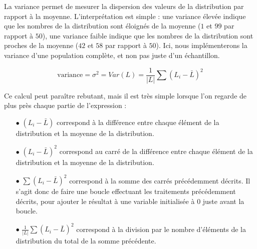 \documentclass[11pt,a4paper]{article}
\begin{document}
\bigskip

La variance permet de mesurer la dispersion des valeurs de la distribution par rapport à la moyenne.
L'interprétation est simple : une variance élevée indique que les nombres de la distribution sont éloignés de la moyenne ($ 1 $ et $ 99 $ par rapport à $ 50 $), une variance faible indique que les nombres de la distribution sont proches de la moyenne ($ 42 $ et $ 58 $ par rapport à $ 50 $).
Ici, nous implémenterons la variance d'une population complète, et non pas juste d'un échantillon.


\begin{center}
\begin{equation*}
\text{variance} = \sigma^{2} = Var(L) = \frac{1}{|L|} \sum (L_{i} - \bar{L})^{2}
\end{equation*}
\end{center}

\bigskip

Ce calcul peut paraître rebutant, mais il est très simple lorsque l'on regarde de plus près chaque partie de l'expression :

\medskip

\begin{itemize}
\item[$\bullet$] $ (L_{i} - \bar{L}) $ correspond à la différence entre chaque élément de la distribution et la moyenne de la distribution.

\item[$\bullet$] $ (L_{i} - \bar{L})^{2} $ correspond au carré de la différence entre chaque élément de la distribution et la moyenne de la distribution.

\item[$\bullet$] $ \sum (L_{i} - \bar{L})^{2} $ correspond à la somme des carrés précédemment décrits. Il s'agit donc de faire une boucle effectuant les traitements précédemment décrits, pour ajouter le résultat à une variable initialisée à $ 0 $ juste avant la boucle.

\item[$\bullet$] $ \frac{1}{|L|} \sum (L_{i} - \bar{L})^{2} $ correspond à la division par le nombre d'éléments de la distribution du total de la somme précédente.
\end{itemize}

\end{document}
